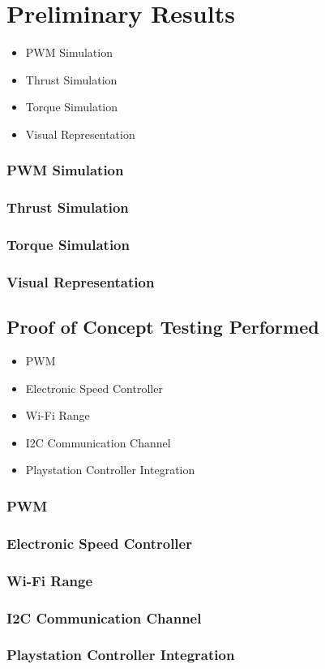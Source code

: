 \section{Preliminary Results}
\begin{itemize}
  \item{PWM Simulation}
  \item{Thrust Simulation}
  \item{Torque Simulation}
  \item{Visual Representation}
 \end{itemize}
  
\subsubsection{PWM Simulation}

\subsubsection{Thrust Simulation}

\subsubsection{Torque Simulation}

\subsubsection{Visual Representation}

  
\subsection{Proof of Concept Testing Performed}
\begin{itemize}
  \item{PWM}
  \item{Electronic Speed Controller}
  \item{Wi-Fi Range}
  \item{I2C Communication Channel}
  \item{Playstation Controller Integration}
 \end{itemize}
  
  \subsubsection{PWM}
  
  \subsubsection{Electronic Speed Controller}
  
  \subsubsection{Wi-Fi Range}
  
  \subsubsection{I2C Communication Channel}
  
  \subsubsection{Playstation Controller Integration}

